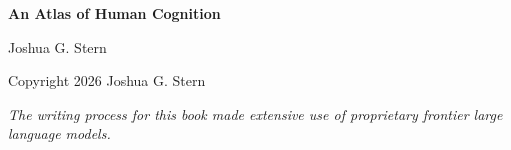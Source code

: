 \documentclass[11pt,oneside]{book}
\begin{document}
\frontmatter

\begin{titlepage}
\centering
\vspace*{2in}

{\Huge\bfseries An Atlas of Human Cognition\par}

\vspace{0.5in}

{\Large Joshua G. Stern\par}

\vfill

{\small Copyright \textcopyright{} 2026 Joshua G. Stern\par}

\vspace{0.5\baselineskip}

{\small\itshape The writing process for this book made extensive use of proprietary frontier large language models.\par}

\end{titlepage}

\tableofcontents

\mainmatter
















\backmatter

\end{document}

